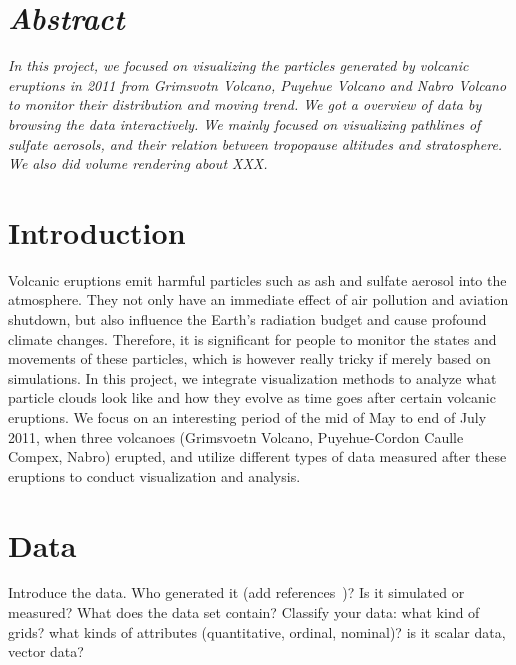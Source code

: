 \documentclass[10pt,twocolumn]{article}
\begin{document}
\maketitle

\section*{\emph{Abstract}}
\emph{
In this project, we focused on visualizing the particles generated by volcanic eruptions in 2011 from Grimsvotn Volcano, Puyehue Volcano and Nabro Volcano to monitor their distribution and moving trend. We got a overview of data by browsing the data interactively. We mainly focused on visualizing pathlines of sulfate aerosols, and their relation between tropopause altitudes and stratosphere. We also did volume rendering about XXX.
}

\section{Introduction}
Volcanic eruptions emit harmful particles such as ash and sulfate aerosol into the atmosphere. They not only have an immediate effect of air pollution and aviation shutdown, but also influence the Earth's radiation budget and cause profound climate changes. Therefore, it is significant for people to monitor the states and movements of these particles, which is however really tricky if merely based on simulations. In this project, we integrate visualization methods to analyze what particle clouds look like and how they evolve as time goes after certain volcanic eruptions. We focus on an interesting period of the mid of May to end of July 2011, when three volcanoes (Grimsvoetn Volcano,  Puyehue-Cordon Caulle Compex,  Nabro) erupted, and utilize different types of data measured after these eruptions to conduct visualization and analysis.

\section{Data}
Introduce the data. Who generated it (add references~\cite{Journal,Conference})? Is it simulated or measured? What does the data set contain?
Classify your data: what kind of grids? what kinds of attributes (quantitative, ordinal, nominal)? is it scalar data, vector data?
\end{document}
